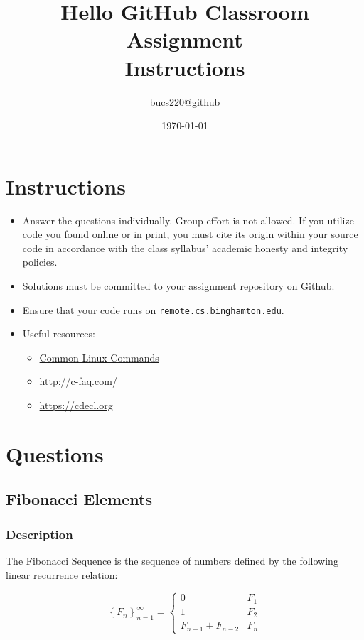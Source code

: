 \documentclass{article}
\begin{document}
  \title{Hello GitHub Classroom Assignment \\ Instructions}
  \author{bucs220@github}
  \date{\today}
  \maketitle

\section{Instructions}
\begin{itemize}
  \item Answer the questions individually. Group effort is not allowed. If you utilize code you found online or in print, you must cite its origin within your source code in accordance with the class syllabus' academic honesty and integrity policies.
  \item Solutions must be committed to your assignment repository on Github.
  \item Ensure that your code runs on \texttt{remote.cs.binghamton.edu}.
  \item Useful resources:
  \begin{itemize}
    \item \href{http://www.informit.com/blogs/blog.aspx?uk=The-10-Most-Important-Linux-Commands}{Common Linux Commands}
    \item \url{http://c-faq.com/}
    \item \url{https://cdecl.org}
  \end{itemize}
\end{itemize}

\section{Questions}
\subsection{Fibonacci Elements}
\subsubsection{Description}
The Fibonacci Sequence is the sequence of numbers defined by the following linear recurrence relation:

\begin{equation}
  \left \{     F_n     \right \}_{n=1}^{\infty } = \begin{cases}
    0 & F_1 \\
    1 & F_2 \\
    F_{n-1} + F_{n-2} & F_n
  \end{cases}
\end{equation}
\end{document}

